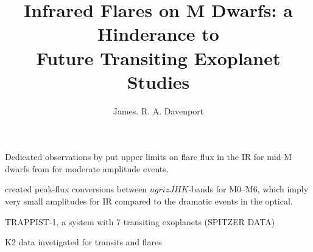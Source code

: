 \documentclass{rnaastex}
\begin{document}
\title{Infrared Flares on M Dwarfs: a Hinderance to\\ Future Transiting Exoplanet Studies}


\author{James. R. A. Davenport}





\section{} 


Dedicated observations by \citet{tofflemire2012} put upper limits on flare flux in the IR for mid-M dwarfs from for moderate amplitude events.

\citet{davenport2012} created peak-flux conversions between $ugrizJHK$-bands for M0--M6, which imply very small amplitudes for IR compared to the dramatic events in the optical.


TRAPPIST-1, a system with 7 transiting exoplanets  (SPITZER DATA) \citep{gillon2017}

K2 data invetigated for transits \citep{luger2017} and flares \citep{vida2017}

\end{document}
